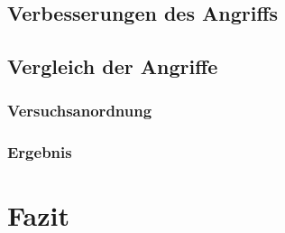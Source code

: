 \documentclass[10pt,a4paper]{article}
\begin{document}
\subsection{Verbesserungen des Angriffs}

\subsection{Vergleich der Angriffe}

\subsubsection{Versuchsanordnung}

\subsubsection{Ergebnis}

\section{Fazit}
\end{document}
